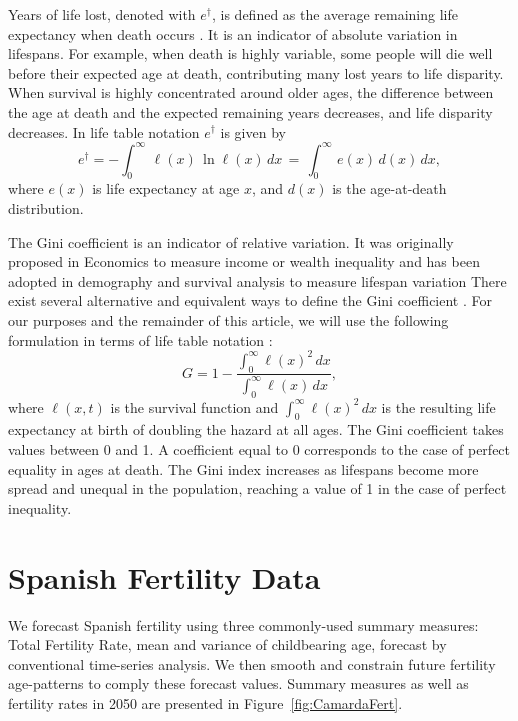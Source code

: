 \documentclass[a4paper,twoside, openright, 12pt, leqno]{article}
\begin{document}
Years of life lost, denoted with $e^\dagger$, is defined as the average remaining life expectancy when death occurs \citep{Vaupel2003,Vaupel2011}. It is an indicator of absolute variation in lifespans. For example, when death is highly variable, some people will die well before their expected age at death, contributing many lost years to life disparity. When survival is highly concentrated around older ages, the difference between the age at death and the expected remaining years decreases, and life disparity decreases. In life table notation $e^\dagger$ is given by \citep{Goldman1986,Vaupel2003}
\begin{equation*}
e^\dagger = -\int_0^\infty\, \ell(x)\,\ln{\ell(x)}\, dx \,=\, \int_0^\infty\, e(x)\,d(x)\, dx,
\end{equation*}
where $e(x)$ is life expectancy at age $x$, and $d(x)$ is the age-at-death distribution.

The Gini coefficient is an indicator of relative variation. It was originally proposed in Economics to measure income or wealth inequality and  has been adopted in demography and survival analysis to measure lifespan variation \citep{Hanada1983,Shkolnikov2003,bonetti2009gini,gigliarano2017longevity}
There exist several alternative and equivalent ways to define the Gini coefficient \citep{yitzhaki2013gini}. For our purposes and the remainder of this article, we will use the following formulation in terms of life table notation \citep{michettid1957,Hanada1983}:
%
\begin{equation}
  \label{Gini_definition}
  G = 1-\frac{\int_0^\infty\ell(x)^2\,dx}{\int_0^\infty\ell(x)\,dx},
\end{equation}
%
where $\ell(x,t)$ is the survival function and $\int_0^\infty \ell(x)^2\,dx$ is the resulting life expectancy at birth of doubling the hazard at all ages. The Gini coefficient takes values between 0 and 1. A coefficient equal to 0 corresponds to the case of perfect equality in ages at death. The Gini index increases as lifespans become more spread and unequal in the population, reaching a value of 1 in the case of perfect inequality.


\section{Spanish Fertility Data}

We forecast Spanish fertility using three commonly-used summary measures: Total Fertility Rate, mean and variance of childbearing age, forecast by conventional time-series analysis. We then smooth and constrain future fertility age-patterns to comply these forecast values. Summary measures as well as fertility rates in 2050 are presented in Figure~\ref{fig:CamardaFert}. 
\end{document}
